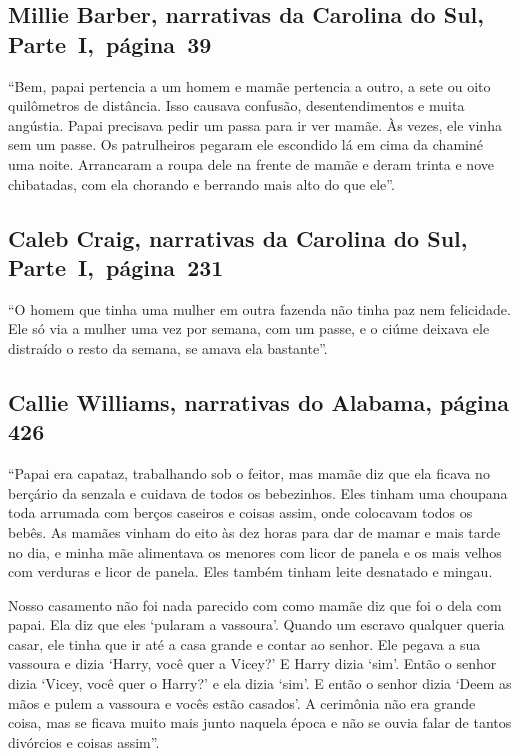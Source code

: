 \subsection{Millie Barber, narrativas da Carolina do Sul, Parte~I,~página~39} \label{ref14}

``Bem, papai pertencia a um homem e mamãe pertencia a outro, a sete ou
oito quilômetros de distância. Isso causava confusão, desentendimentos e
muita angústia. Papai precisava pedir um passa para ir ver mamãe. Às
vezes, ele vinha sem um passe. Os patrulheiros pegaram ele escondido lá
em cima da chaminé uma noite. Arrancaram a roupa dele na frente de mamãe
e deram trinta e nove chibatadas, com ela chorando e berrando mais alto
do que ele''.

\subsection{Caleb Craig, narrativas da Carolina do Sul, Parte~I,~página~231} \label{ref60}

``O homem que tinha uma mulher em outra fazenda não tinha paz nem
felicidade. Ele só via a mulher uma vez por semana, com um passe, e o
ciúme deixava ele distraído o resto da semana, se amava ela bastante''.

\subsection{Callie Williams, narrativas do Alabama, página 426}
\label{ref289}

``Papai era capataz, trabalhando sob o feitor, mas mamãe diz que ela
ficava no berçário da senzala e cuidava de todos os bebezinhos. Eles
tinham uma choupana toda arrumada com berços caseiros e coisas assim,
onde colocavam todos os bebês. As mamães vinham do eito às dez horas
para dar de mamar e mais tarde no dia, e minha mãe alimentava os menores
com licor de panela e os mais velhos com verduras e licor de panela.
Eles também tinham leite desnatado e mingau.

Nosso casamento não foi nada parecido com como mamãe diz que foi o
dela com papai. Ela diz que eles `pularam a vassoura'. Quando um escravo
qualquer queria casar, ele tinha que ir até a casa grande e contar ao
senhor. Ele pegava a sua vassoura e dizia `Harry, você quer a Vicey?' E
Harry dizia `sim'. Então o senhor dizia `Vicey, você quer o Harry?' e
ela dizia `sim'. E então o senhor dizia `Deem as mãos e pulem a vassoura
e vocês estão casados'. A cerimônia não era grande coisa, mas se ficava
muito mais junto naquela época e não se ouvia falar de tantos divórcios
e coisas assim''.

